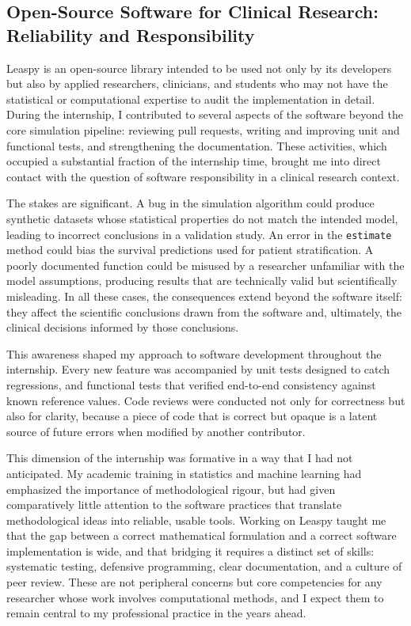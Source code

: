 \documentclass{rapportCS}
\begin{document}
\subsection{Open-Source Software for Clinical Research: Reliability and Responsibility}

Leaspy is an open-source library intended to be used not only by its developers but also by applied researchers, clinicians, and students who may not have the statistical or computational expertise to audit the implementation in detail. During the internship, I contributed to several aspects of the software beyond the core simulation pipeline: reviewing pull requests, writing and improving unit and functional tests, and strengthening the documentation. These activities, which occupied a substantial fraction of the internship time, brought me into direct contact with the question of software responsibility in a clinical research context.

The stakes are significant. A bug in the simulation algorithm could produce synthetic datasets whose statistical properties do not match the intended model, leading to incorrect conclusions in a validation study. An error in the \texttt{estimate} method could bias the survival predictions used for patient stratification. A poorly documented function could be misused by a researcher unfamiliar with the model assumptions, producing results that are technically valid but scientifically misleading. In all these cases, the consequences extend beyond the software itself: they affect the scientific conclusions drawn from the software and, ultimately, the clinical decisions informed by those conclusions.

This awareness shaped my approach to software development throughout the internship. Every new feature was accompanied by unit tests designed to catch regressions, and functional tests that verified end-to-end consistency against known reference values. Code reviews were conducted not only for correctness but also for clarity, because a piece of code that is correct but opaque is a latent source of future errors when modified by another contributor.

This dimension of the internship was formative in a way that I had not anticipated. My academic training in statistics and machine learning had emphasized the importance of methodological rigour, but had given comparatively little attention to the software practices that translate methodological ideas into reliable, usable tools. Working on Leaspy taught me that the gap between a correct mathematical formulation and a correct software implementation is wide, and that bridging it requires a distinct set of skills: systematic testing, defensive programming, clear documentation, and a culture of peer review. These are not peripheral concerns but core competencies for any researcher whose work involves computational methods, and I expect them to remain central to my professional practice in the years ahead.
\end{document}
